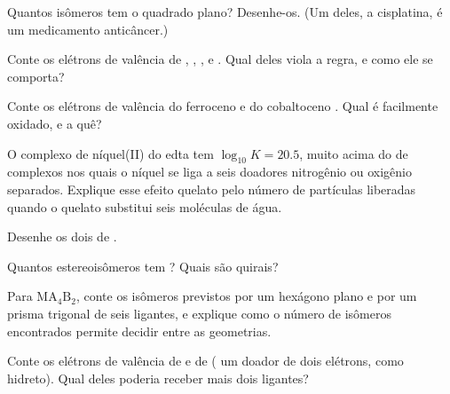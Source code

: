 \begin{exercise}[$\star\star$]\label{exo:b2:coordination-complexes:5}
Quantos isômeros tem o \ce{[PtCl2(NH3)2]} quadrado plano? Desenhe-os. (Um deles,
a cisplatina, é um medicamento anticâncer.)
\end{exercise}

\begin{exercise}[$\star\star$]\label{exo:b2:coordination-complexes:6}
Conte os elétrons de valência de , , ,
 e . Qual deles viola a regra, e como ele se comporta?
\end{exercise}

\begin{exercise}[$\star\star$]\label{exo:b2:coordination-complexes:7}
Conte os elétrons de valência do ferroceno e do cobaltoceno . Qual
é facilmente oxidado, e a quê?
\end{exercise}

\begin{exercise}[$\star\star$]\label{exo:b2:coordination-complexes:8}
O complexo de níquel(II) do edta tem $\log_{10}K = 20.5$, muito acima do de
complexos nos quais o níquel se liga a seis doadores nitrogênio ou oxigênio
separados. Explique esse efeito quelato pelo número de partículas liberadas
quando o quelato substitui seis moléculas de água.
\end{exercise}

\begin{exercise}[$\star\star$]\label{exo:b2:coordination-complexes:9}
Desenhe os dois  de .
\end{exercise}

\begin{exercise}[$\star\star\star$]\label{exo:b2:coordination-complexes:10}
Quantos estereoisômeros tem \ce{[CoCl2(en)2]+}? Quais são quirais?
\end{exercise}

\begin{exercise}[$\star\star\star$]\label{exo:b2:coordination-complexes:11}
Para $\mathrm{MA_4B_2}$, conte os isômeros previstos por um hexágono plano e por um
prisma trigonal de seis ligantes, e explique como o número de isômeros
encontrados permite decidir entre as geometrias.
\end{exercise}

\begin{exercise}[$\star\star\star$]\label{exo:b2:coordination-complexes:12}
Conte os elétrons de valência de  e de 
( um doador de dois elétrons,  como hidreto). Qual deles poderia
receber mais dois ligantes?
\end{exercise}


